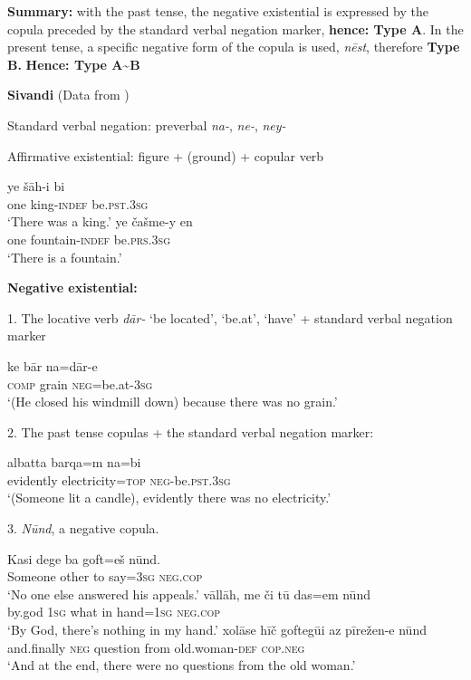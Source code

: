 ﻿\documentclass[output=paper]{langsci/langscibook}
\begin{document}
\begin{unindented}
\textbf{Summary:} with the past tense, the negative existential is expressed by the copula preceded by the standard verbal negation marker, \textbf{hence: Type A}. In the present tense, a specific negative form of the copula is used, \textit{nēst}, therefore \textbf{Type B.} \textbf{Hence: Type A{\textasciitilde}B}
%

\textbf{Sivandi} (Data from \citealt{Lecoq1979}) 

Standard verbal negation: preverbal \textit{na-}, \textit{ne-}, \textit{ney-} 

Affirmative existential: figure + (ground) + copular verb
%
\begin{exe}\ex
    \gll ye šāh-i bi \\
one  king-\textsc{indef}    be.\textsc{pst}.\textsc{3sg} \\
    \glt `There was a king.' \citep[107]{Lecoq1979}
\ex \gll ye   čašme-y      en \\
one  fountain-\textsc{indef}   be.\textsc{prs.3sg} \\
    \glt `There is a fountain.' \citep[127]{Lecoq1979}
    \end{exe}

\textbf{Negative existential:}

1. The locative verb \textit{dār-} `be located', `be.at', `have' + standard verbal negation marker
%
\begin{exe}\ex
    \gll ke   bār   na=dār-e \\
\textsc{comp}   grain  \textsc{neg}=be.at-\textsc{3sg} \\
    \glt `(He closed his windmill down) because there was no grain.' \citep[150]{Lecoq1979}
    \end{exe} 

2. The past tense copulas + the standard verbal negation marker:
%
\begin{exe}\ex
    \gll albatta      barqa=m          na=bi \\
evidently  electricity=\textsc{top} \textsc{neg}-be.\textsc{pst.3sg} \\
    \glt `(Someone lit a candle), evidently there was no electricity.' \citep[89]{Lecoq1979}
    \end{exe}
3. \textit{Nūnd}, a negative copula.
%
\begin{exe}\ex
    \gll Kasi dege  ba goft=eš    nūnd.           \\
Someone other to say=\textsc{3sg}  \textsc{neg}.\textsc{cop}  \\
    \glt `No one else answered his appeals.' \citep[95]{Lecoq1979}
\ex \gll vāllāh, me    či      tū  das=em      nūnd \\
by.god  \textsc{1sg}   what in hand=\textsc{1sg}    \textsc{neg.cop} \\
    \glt `By God, there's nothing in my hand.' \citep[150]{Lecoq1979}
\ex \gll xolāse hīč    goftegūi  az      pīrežen-e          nūnd \\
and.finally \textsc{neg}  question from  old.woman-\textsc{def}   \textsc{cop.neg} \\
    \glt `And at the end, there were no questions from the old woman.' \citep[108]{Lecoq1979}
    \end{exe}


\end{unindented}
\end{document}
